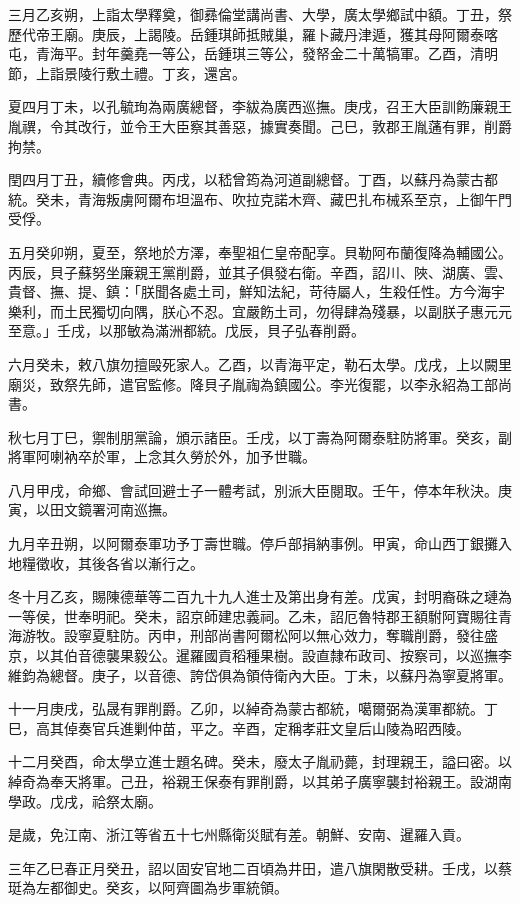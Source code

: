 \begin{pinyinscope}
三月乙亥朔，上詣太學釋奠，御彞倫堂講尚書、大學，廣太學鄉試中額。丁丑，祭歷代帝王廟。庚辰，上謁陵。岳鍾琪師抵賊巢，羅卜藏丹津遁，獲其母阿爾泰喀屯，青海平。封年羹堯一等公，岳鍾琪三等公，發帑金二十萬犒軍。乙酉，清明節，上詣景陵行敷土禮。丁亥，還宮。

夏四月丁未，以孔毓珣為兩廣總督，李紱為廣西巡撫。庚戌，召王大臣訓飭廉親王胤禩，令其改行，並令王大臣察其善惡，據實奏聞。己巳，敦郡王胤蓪有罪，削爵拘禁。

閏四月丁丑，續修會典。丙戌，以嵇曾筠為河道副總督。丁酉，以蘇丹為蒙古都統。癸未，青海叛虜阿爾布坦溫布、吹拉克諾木齊、藏巴扎布械系至京，上御午門受俘。

五月癸卯朔，夏至，祭地於方澤，奉聖祖仁皇帝配享。貝勒阿布蘭復降為輔國公。丙辰，貝子蘇努坐廉親王黨削爵，並其子俱發右衛。辛酉，詔川、陜、湖廣、雲、貴督、撫、提、鎮：「朕聞各處土司，鮮知法紀，苛待屬人，生殺任性。方今海宇樂利，而土民獨切向隅，朕心不忍。宜嚴飭土司，勿得肆為殘暴，以副朕子惠元元至意。」壬戌，以那敏為滿洲都統。戊辰，貝子弘春削爵。

六月癸未，敕八旗勿擅毆死家人。乙酉，以青海平定，勒石太學。戊戌，上以闕里廟災，致祭先師，遣官監修。降貝子胤祹為鎮國公。李光復罷，以李永紹為工部尚書。

秋七月丁巳，禦制朋黨論，頒示諸臣。壬戌，以丁壽為阿爾泰駐防將軍。癸亥，副將軍阿喇衲卒於軍，上念其久勞於外，加予世職。

八月甲戌，命鄉、會試回避士子一體考試，別派大臣閱取。壬午，停本年秋決。庚寅，以田文鏡署河南巡撫。

九月辛丑朔，以阿爾泰軍功予丁壽世職。停戶部捐納事例。甲寅，命山西丁銀攤入地糧徵收，其後各省以漸行之。

冬十月乙亥，賜陳德華等二百九十九人進士及第出身有差。戊寅，封明裔硃之璉為一等侯，世奉明祀。癸未，詔京師建忠義祠。乙未，詔厄魯特郡王額駙阿寶賜往青海游牧。設寧夏駐防。丙申，刑部尚書阿爾松阿以無心效力，奪職削爵，發往盛京，以其伯音德襲果毅公。暹羅國貢稻種果樹。設直隸布政司、按察司，以巡撫李維鈞為總督。庚子，以音德、誇岱俱為領侍衛內大臣。丁未，以蘇丹為寧夏將軍。

十一月庚戌，弘晟有罪削爵。乙卯，以綽奇為蒙古都統，噶爾弼為漢軍都統。丁巳，高其倬奏官兵進剿仲苗，平之。辛酉，定稱孝莊文皇后山陵為昭西陵。

十二月癸酉，命太學立進士題名碑。癸未，廢太子胤礽薨，封理親王，謚曰密。以綽奇為奉天將軍。己丑，裕親王保泰有罪削爵，以其弟子廣寧襲封裕親王。設湖南學政。戊戌，祫祭太廟。

是歲，免江南、浙江等省五十七州縣衛災賦有差。朝鮮、安南、暹羅入貢。

三年乙巳春正月癸丑，詔以固安官地二百頃為井田，遣八旗閑散受耕。壬戌，以蔡珽為左都御史。癸亥，以阿齊圖為步軍統領。


\end{pinyinscope}
